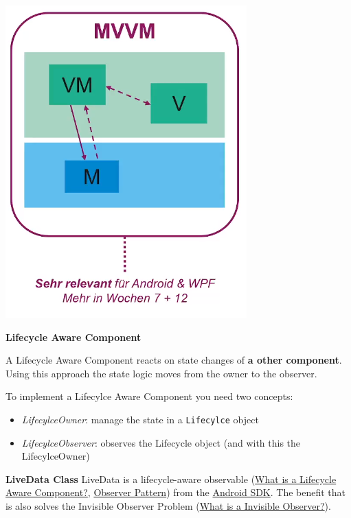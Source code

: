 \documentclass[11pt,twoside,landscape]{article}
\begin{document}
\begin{multicols}{3}
\begin{center}
\includegraphics[width=.9\linewidth]{img/mvvm.png}
\end{center}


\textbf{Lifecycle Aware Component}

A Lifecycle Aware Component reacts on state changes of \textbf{a other component}.
Using this approach the state logic moves from the owner to the observer.

To implement a Lifecylce Aware Component you need two concepts:
\begin{itemize}
\item \emph{LifecylceOwner}: manage the state in a \texttt{Lifecylce} object
\item \emph{LifecylceObserver}: observes the Lifecycle object (and with this the LifecylceOwner)
\end{itemize}


\textbf{LiveData Class}
LiveData is a lifecycle-aware observable (\href{../../../roam/20211112114814-what_is_a_lifecycle_aware_component.org}{What is a Lifecycle Aware Component?}, \href{../../../roam/20211103140808-observer_pattern.org}{Observer Pattern}) from the \href{../../../roam/20210928175951-android_sdk.org}{Android SDK}.
The benefit that is also solves the Invisible Observer Problem (\href{../../../roam/20211112110032-what_is_a_invisible_observer.org}{What is a Invisible Observer?}).


\end{multicols}
\end{document}
